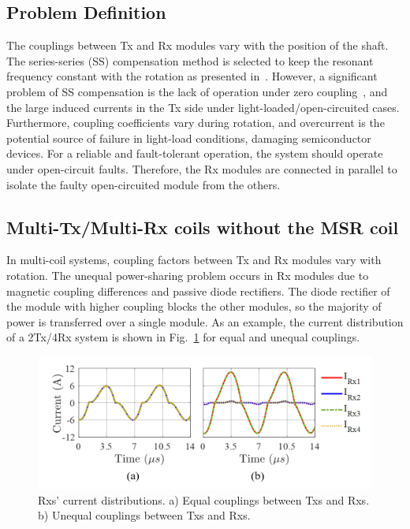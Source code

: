 \documentclass[journal]{IEEEtran}
\begin{document}
\subsection{Problem Definition}
The couplings between Tx and Rx modules vary with the position of the shaft. 
The series-series (SS) compensation method is selected to keep the resonant frequency constant with the rotation as presented in~\cite{fahimi}.
However, a significant problem of SS compensation is the lack of operation under zero coupling~\cite{compenzation}, and the large induced currents in the Tx side under light-loaded/open-circuited cases. 
Furthermore, coupling coefficients vary during rotation, and overcurrent is the potential source of failure in light-load conditions, damaging semiconductor devices.
For a reliable and fault-tolerant operation, the system should operate under open-circuit faults.
Therefore, the Rx modules are connected in parallel to isolate the faulty open-circuited module from the others.
\subsection{Multi-Tx/Multi-Rx coils without the MSR coil}
In multi-coil systems, coupling factors between Tx and Rx modules vary with rotation.
The unequal power-sharing problem occurs in Rx modules due to magnetic coupling differences and passive diode rectifiers.
The diode rectifier of the module with higher coupling blocks the other modules, so the majority of power is transferred over a single module.
As an example, the current distribution of a 2Tx/4Rx system is shown in Fig.~\ref{fig:balance-4Rx} for equal and unequal couplings.

\begin{figure}[h]
    \centering
    \includegraphics[width=1\linewidth]{balance_Rx2.png}
    \caption{ Rxs' current distributions. a) Equal couplings between Txs and Rxs. b) Unequal couplings between Txs and Rxs.}
    \label{fig:balance-4Rx}
\end{figure}
\vspace*{-4mm}
\end{document}
